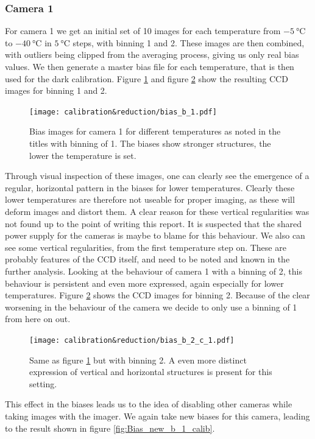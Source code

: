 \documentclass{article}
\begin{document}
\subsubsection{Camera 1}
For camera 1 we get an initial set of 10 images for each temperature from $\SI{-5}{\celsius}$ to $\SI{-40}{\celsius}$ in $\SI{5}{\celsius}$ steps, with binning 1 and 2. These images are then combined, with outliers being clipped from the averaging process, giving us only real bias values. We then generate a master bias file for each temperature, that is then used for the dark calibration. Figure \ref{fig:Bias_old_b_1_calib} and figure \ref{fig:Bias_old_b_2_calib} show the resulting CCD images for binning 1 and 2.
\begin{figure}[H]
    \centering
    \texttt{[image: calibration\&reduction/bias\_b\_1.pdf]}
    \caption{Bias images for camera 1 for different temperatures as noted in the titles with binning of 1. The biases show stronger structures, the lower the temperature is set.}
    \label{fig:Bias_old_b_1_calib}
\end{figure}
Through visual inspection of these images, one can clearly see the emergence of a regular, horizontal pattern in the biases for lower temperatures. Clearly these lower temperatures are therefore not useable for proper imaging, as these will deform images and distort them. A clear reason for these vertical regularities was not found up to the point of writing this report. It is suspected that the shared power supply for the cameras is maybe to blame for this behaviour. We also can see some vertical regularities, from the first temperature step on. These are probably features of the CCD itself, and need to be noted and known in the further analysis. Looking at the behaviour of camera 1 with a binning of 2, this behaviour is persistent and even more expressed, again especially for lower temperatures. Figure \ref{fig:Bias_old_b_2_calib} shows the CCD images for binning 2. Because of the clear worsening in the behaviour of the camera we decide to only use a binning of 1 from here on out.
\begin{figure}[H]
    \centering
    \texttt{[image: calibration\&reduction/bias\_b\_2\_c\_1.pdf]}
    \caption{Same as figure \ref{fig:Bias_old_b_1_calib} but with binning 2. A even more distinct expression of vertical and horizontal structures is present for this setting.}
    \label{fig:Bias_old_b_2_calib}
\end{figure}
This effect in the biases leads us to the idea of disabling other cameras while taking images with the imager. We again take new biases for this camera, leading to the result shown in figure \ref{fig:Bias_new_b_1_calib}.
\end{document}
